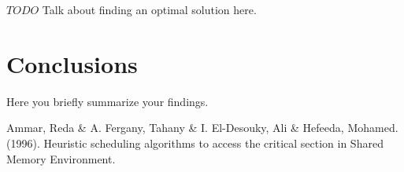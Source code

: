 \documentclass[letterpaper,12pt]{article}
\begin{document}
$TODO$ Talk about finding an optimal solution here.  


\section{Conclusions}
Here you briefly summarize your findings.


\begin{thebibliography}{99}

Ammar, Reda \& A. Fergany, Tahany \& I. El-Desouky, Ali \& Hefeeda, Mohamed. (1996). Heuristic scheduling algorithms to access the critical section in Shared Memory Environment. 

\end{thebibliography}
\end{document}
